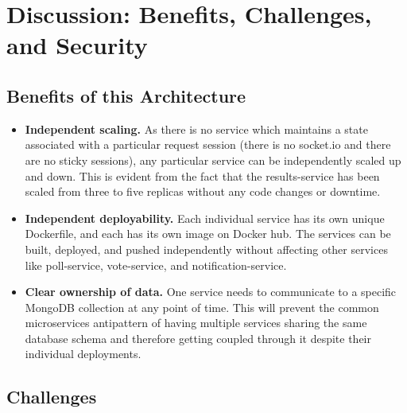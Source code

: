 \section{Discussion: Benefits, Challenges, and Security}

\subsection{Benefits of this Architecture}

\begin{itemize}
    \item \textbf{Independent scaling.} As there is no service which maintains a state associated with a particular request session (there is no socket.io and there are no sticky sessions), any particular service can be independently scaled up and down. This is evident from the fact that the results-service has been scaled from three to five replicas without any code changes or downtime.

    \item \textbf{Independent deployability.} Each individual service has its own unique Dockerfile, and each has its own image on Docker hub. The services can be built, deployed, and pushed independently without affecting other services like poll-service, vote-service, and notification-service.

    \item \textbf{Clear ownership of data.} One service needs to communicate to a specific MongoDB collection at any point of time. This will prevent the common microservices antipattern of having multiple services sharing the same database schema and therefore getting coupled through it despite their individual deployments.
\end{itemize}

\subsection{Challenges}

